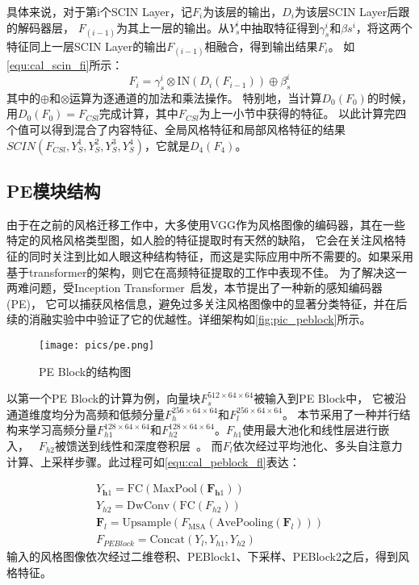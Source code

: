 具体来说，对于第i个SCIN Layer，记$F_i$为该层的输出，$D_i$为该层SCIN Layer后跟的解码器层， 
$F_{(i-1)}$为其上一层的输出。从$Y_s^i$中抽取特征得到\(\gamma_{s}^{i}\)和\(\beta{s}^{i}\)，将这两个特征同上一层SCIN Layer的输出$F_{(i-1)}$相融合，得到输出结果$F_i$。
如\autoref{equ:cal_scin_fi}所示：
\begin{equation}
    \label{equ:cal_scin_fi}
    F_i=\gamma_s^i\otimes\mathrm{IN}(D_i(F_{i-1}))\oplus\beta_s^i
\end{equation}
其中的$\oplus$和$\otimes$运算为逐通道的加法和乘法操作。
特别地，当计算\(D_0(F_0)\)的时候，用\(D_0(F_0)=F_{CSl}\)完成计算，其中$F_{CSl}$为上一小节中获得的特征。
以此计算完四个值可以得到混合了内容特征、全局风格特征和局部风格特征的结果\(SCIN(F_{CSl},Y_S^1,Y_S^2,Y_S^3,Y_S^4)\)，它就是\(D_4(F_4)\)。

\subsection{PE模块结构}

由于在之前的风格迁移工作中，大多使用VGG作为风格图像的编码器，其在一些特定的风格风格类型图，如人脸的特征提取时有天然的缺陷，
它会在关注风格特征的同时关注到比如人眼这种结构特征，而这是实际应用中所不需要的。如果采用基于transformer的架构，则它在高频特征提取的工作中表现不佳。
为了解决这一两难问题，受Inception Transformer~\cite{si2022inception}启发，本节提出了一种新的感知编码器(PE)，
它可以捕获风格信息，避免过多关注风格图像中的显著分类特征，并在后续的消融实验中中验证了它的优越性。详细架构如\autoref{fig:pic_peblock}所示。
\begin{figure}[h]
    \centering
    \texttt{[image: pics/pe.png]}
    \caption{\label{fig:pic_peblock}PE Block的结构图}
\end{figure}
以第一个PE Block的计算为例，向量块\(F_s^{512\times64\times64}\)被输入到PE Block中，
它被沿通道维度均分为高频和低频分量\(F_h^{256\times64\times64}\text{和}F_l^{256\times64\times64}\)。
本节采用了一种并行结构来学习高频分量\(F_{h1}^{128\times64\times64}\text{和}F_{h2}^{128\times64\times64}\)。$F_{h1}$使用最大池化和线性层进行嵌入，~\cite{szegedy2015going}
$F_{h2}$被馈送到线性和深度卷积层~\cite{mamalet2012simplifying,chollet2017xception}。
而$F_l$依次经过平均池化、多头自注意力计算、上采样步骤。此过程可如\autoref{equ:cal_peblock_fl}表达：

\begin{equation}
    \label{equ:cal_peblock_fl}
    \begin{gathered}
        Y_{\boldsymbol{h}1}=\mathrm{FC}(\mathrm{MaxPool}(\boldsymbol{F}_{\boldsymbol{h}1})) \\
        Y_{h2}=\mathrm{DwConv}(\mathrm{FC}(F_{h2})) \\
        \boldsymbol{F}_{l}=\mathrm{Upsample}\left(F_{\mathrm{MSA}}(\mathrm{AvePooling}(\boldsymbol{F}_{l}))\right) \\
        F_{PE Block}=\mathrm{Concat}(Y_l,Y_{h1},Y_{h2})
        \end{gathered}
\end{equation}
输入的风格图像依次经过二维卷积、PEBlock1、下采样、PEBlock2之后，得到风格特征。

